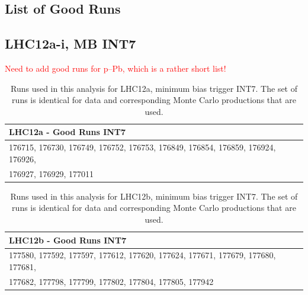 \documentclass[ALICE]{ALICE_analysis_notes}
\newcommand{\pPb}{{\mbox{p--Pb}}\xspace}
\begin{document}
\begin{appendix}
\section{List of Good Runs}
\label{sec:goodRuns}
\subsection{LHC12a-i, MB INT7}
\label{subsec:goodRuns12}
\textcolor{red}{Need to add good runs for \pPb, which is a rather short list!}

\begin{table}[h!]
	\hspace*{-0.2cm}
	\small
	\centering
	\begin{tabular}{ll}  
	    \toprule
	    \textbf{LHC12a - Good Runs INT7} \\ \midrule
		176715, 176730, 176749, 176752, 176753, 176849, 176854, 176859, 176924, 176926, \\ \midrule
		176927, 176929, 177011 \\
		\bottomrule
	\end{tabular}
	\caption{Runs used in this analysis for LHC12a, minimum bias trigger INT7. The set of runs is identical for data and corresponding Monte Carlo productions that are used.}
	\label{tab:runs12a}
\end{table}

\begin{table}[h!]
	\hspace*{-0.2cm}
	\small
	\centering
	\begin{tabular}{ll}  
	    \toprule
	    \textbf{LHC12b - Good Runs INT7} \\ \midrule
		177580, 177592, 177597, 177612, 177620, 177624, 177671, 177679, 177680, 177681, \\ \midrule
		177682, 177798, 177799, 177802, 177804, 177805, 177942 \\
		\bottomrule
	\end{tabular}
	\caption{Runs used in this analysis for LHC12b, minimum bias trigger INT7. The set of runs is identical for data and corresponding Monte Carlo productions that are used.}
	\label{tab:runs12b}
\end{table}


\end{appendix}
\end{document}
